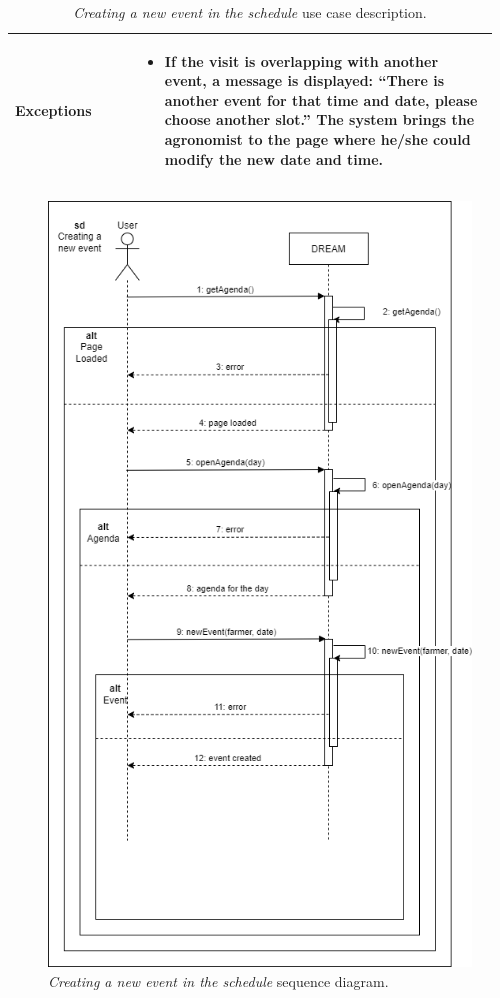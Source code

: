 \begin{table}[H]
\begin{tabular}{@{}p{0.25\linewidth}p{0.71\linewidth}@{}}
        \hline
        \textbf{Exceptions} &
        \begin{itemize}[leftmargin=.4cm,noitemsep,topsep=0pt,before=\vspace{-3mm},after=\vspace{-4mm}]
            \item If the visit is overlapping with another event, a message is displayed: “There is another event for that time and date, please choose another slot.” The system brings the agronomist to the page where he/she could modify the new date and time.
        \end{itemize} \\
        \hline
    \end{tabular}
    \caption{\textit{Creating a new event in the schedule} use case description.}
\end{table}
\begin{figure}[H]
    \centering
    \includegraphics[height=1.5\linewidth]{Images/Use Case/UC18.png}
    \caption{\textit{Creating a new event in the schedule} sequence diagram.}
\end{figure}
\newpage

